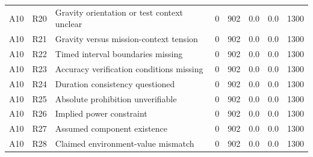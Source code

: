 \begin{tabular}{llllllll}
A10 & R20 & Gravity orientation or test context unclear & 0 & 902 & 0.0 & 0.0 & 1300 \\
A10 & R21 & Gravity versus mission-context tension & 0 & 902 & 0.0 & 0.0 & 1300 \\
A10 & R22 & Timed interval boundaries missing & 0 & 902 & 0.0 & 0.0 & 1300 \\
A10 & R23 & Accuracy verification conditions missing & 0 & 902 & 0.0 & 0.0 & 1300 \\
A10 & R24 & Duration consistency questioned & 0 & 902 & 0.0 & 0.0 & 1300 \\
A10 & R25 & Absolute prohibition unverifiable & 0 & 902 & 0.0 & 0.0 & 1300 \\
A10 & R26 & Implied power constraint & 0 & 902 & 0.0 & 0.0 & 1300 \\
A10 & R27 & Assumed component existence & 0 & 902 & 0.0 & 0.0 & 1300 \\
A10 & R28 & Claimed environment-value mismatch & 0 & 902 & 0.0 & 0.0 & 1300 \\
\hline
\end{tabular}